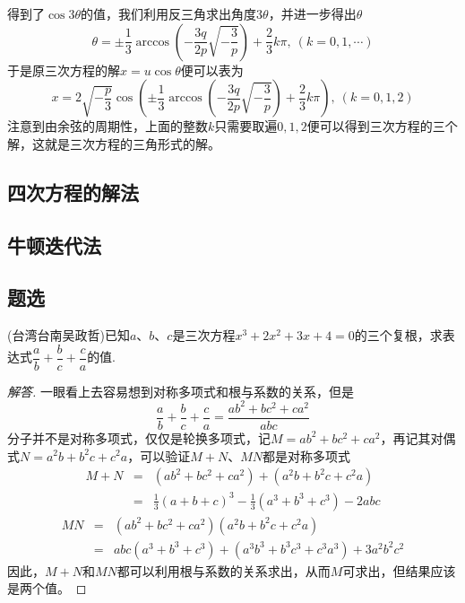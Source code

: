 得到了$\cos{3\theta}$的值，我们利用反三角求出角度$3\theta$，并进一步得出$\theta$
\[ \theta= \pm \frac{1}{3}\arccos \left( -\frac{3q}{2p}\sqrt{-\frac{3}{p}} \right) + \frac{2}{3}k\pi, \  (k=0,1,\cdots) \]
于是原三次方程的解$x=u\cos{\theta}$便可以表为
\[ x=2\sqrt{-\frac{p}{3}} \cos{\left( \pm \frac{1}{3}\arccos \left( -\frac{3q}{2p}\sqrt{-\frac{3}{p}} \right) + \frac{2}{3}k\pi \right)}, \  (k=0,1,2) \]
注意到由余弦的周期性，上面的整数$k$只需要取遍$0,1,2$便可以得到三次方程的三个解，这就是三次方程的三角形式的解。

\subsection{四次方程的解法}
\label{sec:solve-equation-with-4-degree}

\subsection{牛顿迭代法}
\label{sec:newton-iterator-method}

\subsection{题选}
\label{sec:exercise-of-solve-equation}

\begin{exercise}
  (台湾台南吴政哲)已知$a$、$b$、$c$是三次方程$x^3+2x^2+3x+4=0$的三个复根，求表达式$\dfrac{a}{b}+\dfrac{b}{c}+\dfrac{c}{a}$的值.
\end{exercise}

\begin{proof}[解答]
  一眼看上去容易想到对称多项式和根与系数的关系，但是
  \[ \frac{a}{b}+\frac{b}{c}+\frac{c}{a} = \frac{ab^2+bc^2+ca^2}{abc} \]
  分子并不是对称多项式，仅仅是轮换多项式，记$M=ab^2+bc^2+ca^2$，再记其对偶式$N=a^2b+b^2c+c^2a$，可以验证$M+N$、$MN$都是对称多项式
  \begin{eqnarray*}
    M+N & = & (ab^2+bc^2+ca^2) + (a^2b+b^2c+c^2a) \\
    & = & \frac{1}{3}(a+b+c)^3-\frac{1}{3}(a^3+b^3+c^3)-2abc
  \end{eqnarray*}
  \begin{eqnarray*}
    MN & = &(ab^2+bc^2+ca^2)(a^2b+b^2c+c^2a) \\
    & = & abc(a^3+b^3+c^3)+(a^3b^3+b^3c^3+c^3a^3)+3a^2b^2c^2
  \end{eqnarray*}
  因此，$M+N$和$MN$都可以利用根与系数的关系求出，从而$M$可求出，但结果应该是两个值。
\end{proof}


